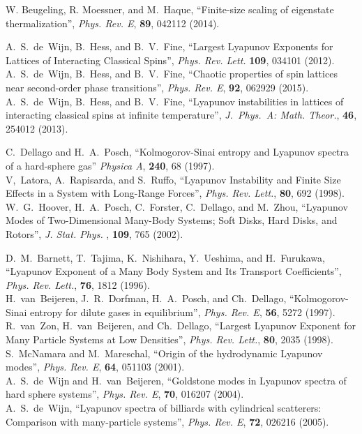 \documentclass[a4paper, onecolumn]{revtex4-1}
\begin{document}
\begin{thebibliography}{1}
W. Beugeling, R. Moessner, and M.~Haque, 
``Finite-size scaling of eigenstate thermalization'', 
{\em Phys. Rev. E}, {\bf 89}, 042112 (2014). 



A.~S.~de~Wijn, B.~Hess, and B.~V.~Fine, 
``Largest Lyapunov Exponents for Lattices of Interacting Classical Spins'', 
{\em Phys. Rev. Lett.} {\bf 109}, 034101 (2012). 
%
\\
%
A.~S.~de~Wijn, B.~Hess, and B.~V.~Fine, 
``Chaotic properties of spin lattices near second-order phase transitions'',
{\em Phys. Rev. E}, {\bf 92}, 062929 (2015). 
%
\\
%
A.~S.~de~Wijn, B.~Hess, and B.~V.~Fine, 
``Lyapunov instabilities in lattices of interacting classical spins at infinite temperature'', 
{\em J.~Phys.~A: Math. Theor.}, {\bf 46}, 254012 (2013). 


C.~Dellago and H.~A.~Posch, 
``Kolmogorov-Sinai entropy and Lyapunov spectra of a hard-sphere gas''  
{\em Physica A},  {\bf 240}, 68 (1997).
%
\\
%
V,~Latora, A.~Rapisarda, and S.~Ruffo, 
``Lyapunov Instability and Finite Size Effects in a System with Long-Range Forces'', 
{\em Phys. Rev. Lett.}, {\bf 80}, 692 (1998). 
%
\\
%
W.~G.~Hoover, H.~A.~Posch, C.~Forster, C.~Dellago, and M.~Zhou, 
``Lyapunov Modes of Two-Dimensional Many-Body Systems; Soft Disks, Hard Disks, and Rotors'', 
{\em J. Stat. Phys.} , {\bf 109}, 765 (2002).


D.~M.~Barnett, T.~Tajima, K.~Nishihara, Y.~Ueshima, and H.~Furukawa, 
``Lyapunov Exponent of a Many Body System and Its Transport Coefficients'', 
{\em Phys. Rev. Lett.},  {\bf 76}, 1812 (1996). 
%
\\
%
H.~van~Beijeren, J.~R.~Dorfman, H.~A.~Posch, and Ch.~Dellago, 
``Kolmogorov-Sinai entropy for dilute gases in equilibrium'', 
{\em Phys. Rev. E}, {\bf 56}, 5272 (1997). 
%
\\
%
R.~van~Zon, H.~van~Beijeren, and Ch.~Dellago, 
``Largest Lyapunov Exponent for Many Particle Systems at Low Densities'', 
{\em Phys. Rev. Lett.},  {\bf 80}, 2035 (1998). 
%
\\
%
S.~McNamara and M.~Mareschal, 
``Origin of the hydrodynamic Lyapunov modes'', 
{\em Phys. Rev. E},  {\bf 64}, 051103 (2001). 
%
\\
%
A.~S.~de~Wijn and H.~van~Beijeren, 
``Goldstone modes in Lyapunov spectra of hard sphere systems'', 
{\em Phys. Rev. E},  {\bf 70}, 016207 (2004).
%
\\
%
A.~S.~de~Wijn, 
``Lyapunov spectra of billiards with cylindrical scatterers: Comparison with many-particle
systems'', 
{\em Phys. Rev. E},  {\bf 72}, 026216 (2005). 



\end{thebibliography}
\end{document}
